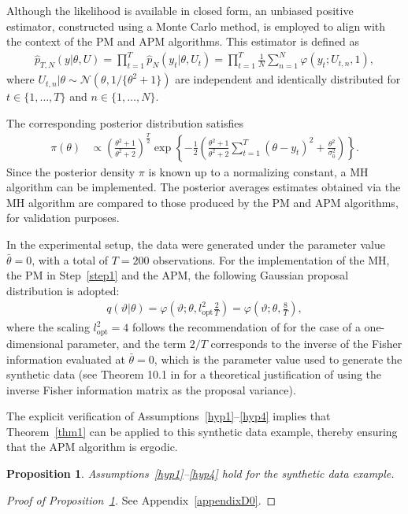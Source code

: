 \documentclass[pdflatex,sn-mathphys-num]{sn-jnl}
\newcommand{\textopt}{\text{opt}}
\theoremstyle{thmstyleone}
\newtheorem{proposition}{Proposition}
\theoremstyle{thmstyletwo}
\theoremstyle{thmstylethree}
\begin{document}
Although the likelihood is available in closed form, an unbiased positive estimator, constructed using a Monte Carlo method, is employed to align with the context of the PM and APM algorithms. This estimator is defined as
\begin{align}
    \widehat{p}_{T,N}(y |\theta, U) = \prod_{t=1}^{T} \widehat{p}_{N}(y_t |\theta, U_t) = \prod_{t=1}^{T} \frac{1}{N} \sum_{n=1}^{N} \varphi(y_t ; U_{t,n}, 1),
    \label{se:estimator}
\end{align}
where \( U_{t,n} |\theta \sim \mathcal{N}(\theta, 1/\{\theta^2 + 1\}) \) are independent and identically distributed for \( t \in \{1,\ldots, T\} \) and \( n \in \{1,\ldots, N\} \).

The corresponding posterior distribution satisfies
\begin{align}
    \pi(\theta) 
    &\propto \left( \frac{\theta^2 + 1}{\theta^2 + 2} \right)^{\frac{T}{2}} \exp\left\{ -\frac{1}{2} \left( \frac{\theta^2 + 1}{\theta^2 + 2} \sum_{t=1}^{T}(\theta - y_t)^2 + \frac{\theta^2}{\sigma_0^2} \right) \right\}.
    \label{SEpi}
\end{align}
Since the posterior density \( \pi \) is known up to a normalizing constant, a MH algorithm can be implemented. The posterior averages estimates obtained via the MH algorithm are compared to those produced by the PM and APM algorithms, for validation purposes.

In the experimental setup, the data were generated under the parameter value \( \bar\theta = 0 \), with a total of \( T = 200 \) observations. For the implementation of the MH, the PM in Step~\ref{step1} and the APM, the following Gaussian proposal distribution is adopted:
\begin{align}
    q(\vartheta |\theta) = \varphi\left(\vartheta; \theta, l_\textopt^2\frac{2}{T}\right) = \varphi\left(\vartheta; \theta, \frac{8}{T}\right),
    \label{intru}
\end{align}
where the scaling \( l_\text{opt}^2 = 4 \) follows the recommendation of \cite{schmon_large-sample_2021} for the case of a one-dimensional parameter, and the term \( 2/T \) corresponds to the inverse of the Fisher information evaluated at \( \bar{\theta} = 0 \), which is the parameter value used to generate the synthetic data (see Theorem 10.1 in \cite{Vaart_1998} for a theoretical justification of using the inverse Fisher information matrix as the proposal variance).

The explicit verification of Assumptions~\ref{hyp1}--\ref{hyp4} implies that Theorem~\ref{thm1} can be applied to this synthetic data example, thereby ensuring that the APM algorithm is ergodic.
\begin{proposition}
\label{se:verification}
Assumptions~\ref{hyp1}--\ref{hyp4} hold for the synthetic data example.
\end{proposition}
\begin{proof}[Proof of Proposition~\ref{se:verification}]
See Appendix~\ref{appendixD0}.
\end{proof}
\end{document}
